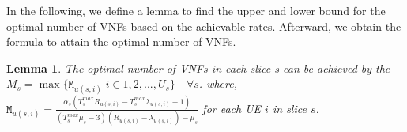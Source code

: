 \documentclass[lettersize,journal]{IEEEtran}
\newtheorem{lemma}{Lemma}
\begin{document}
In the following, we define a lemma to find the upper and lower bound for the optimal number of VNFs based on the achievable rates. Afterward, we obtain the formula to attain the optimal number of VNFs.  
\begin{lemma}
The optimal number of VNFs in each slice s can be achieved by the 
$M_s = \max\{\mathtt{M}_{u(s,i)} | i \in 1,2,..., U_s\} \quad \forall s$.
where, $\mathtt{M}_{u(s,i)} = \frac{\alpha_s(T^{max}_s R_{u(s,i)}-T^{max}_s\lambda_{u(s,i)} -1)}{(T^{max}_s\mu_s-3)(R_{u(s,i)}-\lambda_{u(s,i)}) - \mu_s }$ for each UE $i$ in slice $s$.
\end{lemma}
\end{document}
